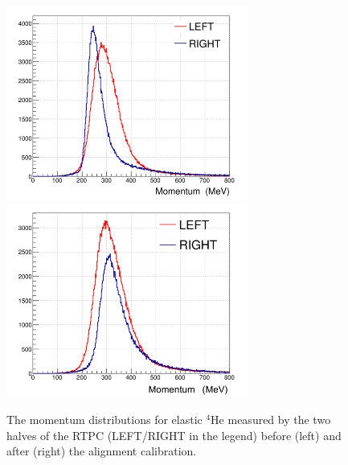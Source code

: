 \documentclass[amsmath,amssymb,notitlepage,12pt]{revtex4-1}
\begin{document}
\begin{figure}[htbp]\centering
    \includegraphics[width=8cm]{pics/CLASRTPC_dp_phi_epass1v9_precorr.png}
    \includegraphics[width=8cm]{pics/Elasticmom_v11_2.png}
    \caption{The momentum distributions for elastic $^4$He measured by the two halves of the RTPC (LEFT/RIGHT in the legend) before (left) and after (right) the alignment calibration.\label{fig:dp_CLAS}}
\end{figure}





\end{document}
